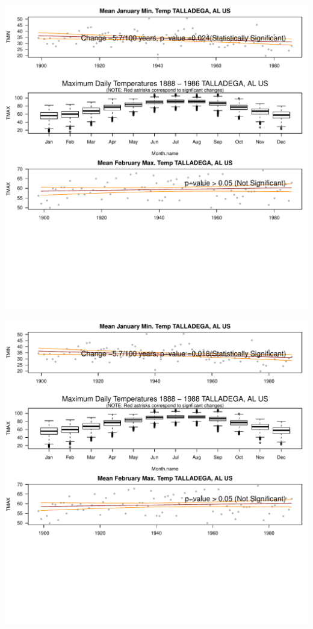 \documentclass{article}\usepackage[]{graphicx}\usepackage[]{color}
\makeatletter
\def\maxwidth{ %
  \ifdim\Gin@nat@width>\linewidth
    \linewidth
  \else
    \Gin@nat@width
  \fi
}
\newenvironment{knitrout}{}{} %
\makeatother
\begin{document}
\begin{knitrout}
\includegraphics[width=\maxwidth]{figure/static_template-39} 

\includegraphics[width=\maxwidth]{figure/static_template-40} 


\end{knitrout}
\end{document}
